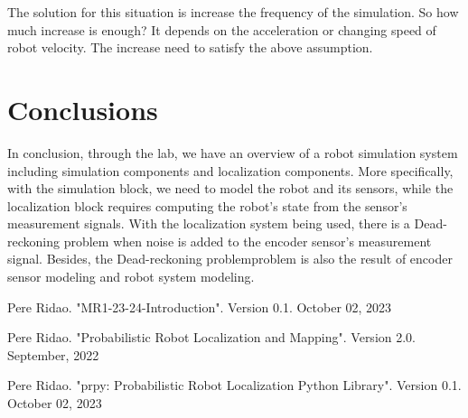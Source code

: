 \documentclass[letterpaper,12pt]{article}
\begin{document}
\noindent
The solution for this situation is increase the frequency of the simulation. So how much increase is enough? It depends on the acceleration or changing speed of robot velocity. The increase need to satisfy the above assumption. 

\section{Conclusions}
\label{sec:Conclussions}
In conclusion, through the lab, we have an overview of a robot simulation system including simulation components and localization components. More specifically, with the simulation block, we need to model the robot and its sensors, while the localization block requires computing the robot's state from the sensor's measurement signals. With the localization system being used, there is a Dead-reckoning problem when noise is added to the encoder sensor's measurement signal. Besides, the Dead-reckoning problemproblem is also the result of encoder sensor modeling and robot system modeling.




\begin{thebibliography}{99}
Pere Ridao. "MR1-23-24-Introduction". Version 0.1. October 02, 2023

Pere Ridao. "Probabilistic Robot Localization and Mapping". Version 2.0. September, 2022

Pere Ridao. "prpy: Probabilistic Robot Localization Python Library". Version 0.1. October 02, 2023

\end{thebibliography}
\end{document}
